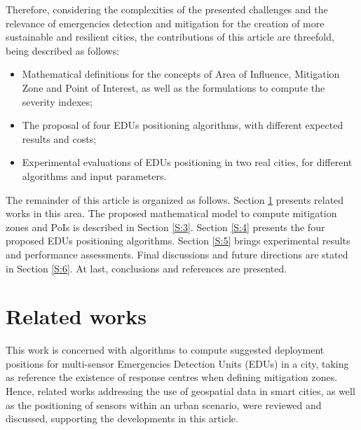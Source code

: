 \begin{refsection}
Therefore, considering the complexities of the presented challenges and the relevance of emergencies detection and mitigation for the creation of more sustainable and resilient cities, the contributions of this article are threefold, being described as follows:

\begin{itemize}
    \item Mathematical definitions for the concepts of Area of Influence, Mitigation Zone and Point of Interest, as well as the formulations to compute the severity indexes;
    \item The proposal of four EDUs positioning algorithms, with different expected results and costs;
    \item Experimental evaluations of EDUs positioning in two real cities, for different algorithms and input parameters.
\end{itemize}

The remainder of this article is organized as follows. Section \ref{S:2} presents related works in this area. The proposed mathematical model to compute mitigation zones and PoIs is described in Section \ref{S:3}. Section \ref{S:4} presents the four proposed EDUs positioning algorithms. Section \ref{S:5} brings experimental results and performance assessments. Final discussions and future directions are stated in Section \ref{S:6}. At last, conclusions and references are presented.

\section{Related works}
\label{S:2}

This work is concerned with algorithms to compute suggested deployment positions for multi-sensor Emergencies Detection Units (EDUs) in a city, taking as reference the existence of response centres when defining mitigation zones. Hence, related works addressing the use of geospatial data in smart cities, as well as the positioning of sensors within an urban scenario, were reviewed and discussed, supporting the developments in this article.


\end{refsection}
